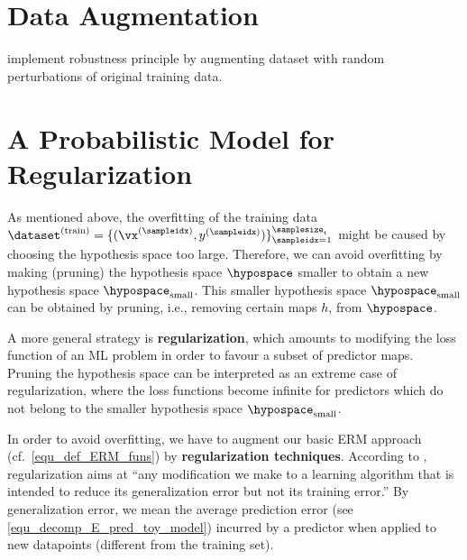 \documentclass[12pt]{report}
\begin{document}
\section{Data Augmentation} 
\label{sec_data_augmentation} 
implement robustness principle by augmenting dataset with random perturbations of original training data. 



\section{A Probabilistic Model for Regularization}
\label{sec_prob_mod_regularization}

As mentioned above, the overfitting of the training data 
$\dataset^{(\rm train)}=\{(\vx^{(\sampleidx)},y^{(\sampleidx)})\}_{\sampleidx=1}^{\samplesize_{\rm t}}$ 
might be caused by choosing the hypothesis space too large. Therefore, we can avoid 
overfitting by making (pruning) the hypothesis space $\hypospace$ smaller to obtain a new 
hypothesis space $\hypospace_{\rm small}$. This smaller hypothesis space $\hypospace_{\rm small}$ 
can be obtained by pruning, i.e., removing certain maps $h$, from $\hypospace$. 

A more general strategy is {\bf regularization}, which amounts to modifying the loss 
function of an ML problem in order to favour a subset of predictor maps. Pruning the 
hypothesis space can be interpreted as an extreme case of regularization, where the 
loss functions become infinite for predictors which do not belong to the smaller 
hypothesis space $\hypospace_{\rm small}$. 

%

In order to avoid overfitting, we have to augment our basic ERM approach 
(cf.\ \eqref{equ_def_ERM_funs}) by {\bf regularization techniques}. According 
to \cite{Goodfellow-et-al-2016}, regularization aims at ``any modification we 
make to a learning algorithm that is intended to reduce its generalization error 
but not its training error.'' By generalization error, we mean the average prediction 
error (see \eqref{equ_decomp_E_pred_toy_model}) incurred by a predictor 
when applied to new datapoints (different from the training set). 
\end{document}
